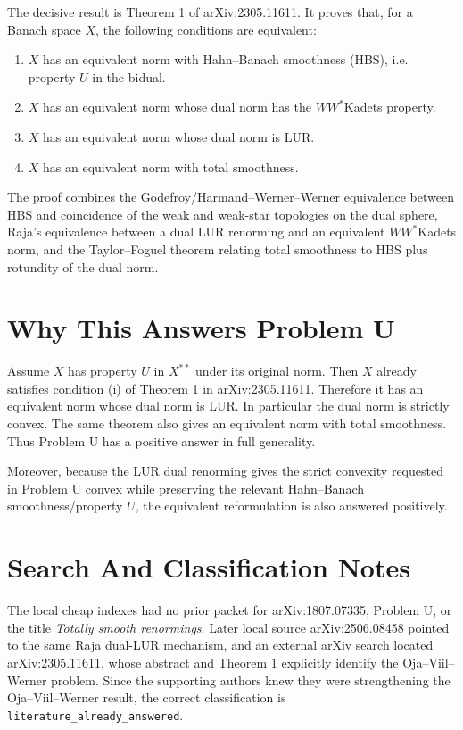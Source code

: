 \documentclass[11pt]{article}
\begin{document}
The decisive result is Theorem 1 of arXiv:2305.11611. It proves that,
for a Banach space $X$, the following conditions are equivalent:
\begin{enumerate}
\item $X$ has an equivalent norm with Hahn--Banach smoothness (HBS),
      i.e. property $U$ in the bidual.
\item $X$ has an equivalent norm whose dual norm has the
      $WW^*$Kadets property.
\item $X$ has an equivalent norm whose dual norm is LUR.
\item $X$ has an equivalent norm with total smoothness.
\end{enumerate}

The proof combines the Godefroy/Harmand--Werner--Werner equivalence
between HBS and coincidence of the weak and weak-star topologies on the
dual sphere, Raja's equivalence between a dual LUR renorming and an
equivalent $WW^*$Kadets norm, and the Taylor--Foguel theorem relating
total smoothness to HBS plus rotundity of the dual norm.

\section*{Why This Answers Problem U}

Assume $X$ has property $U$ in $X^{**}$ under its original norm. Then
$X$ already satisfies condition (i) of Theorem 1 in arXiv:2305.11611.
Therefore it has an equivalent norm whose dual norm is LUR. In
particular the dual norm is strictly convex. The same theorem also gives
an equivalent norm with total smoothness. Thus Problem U has a positive
answer in full generality.

Moreover, because the LUR dual renorming gives the strict convexity
requested in Problem U convex while preserving the relevant
Hahn--Banach smoothness/property $U$, the equivalent reformulation is
also answered positively.

\section*{Search And Classification Notes}

The local cheap indexes had no prior packet for arXiv:1807.07335,
Problem U, or the title \emph{Totally smooth renormings}. Later local
source arXiv:2506.08458 pointed to the same Raja dual-LUR mechanism, and
an external arXiv search located arXiv:2305.11611, whose abstract and
Theorem 1 explicitly identify the Oja--Viil--Werner problem. Since the
supporting authors knew they were strengthening the Oja--Viil--Werner
result, the correct classification is \texttt{literature\_already\_answered}.
\end{document}
